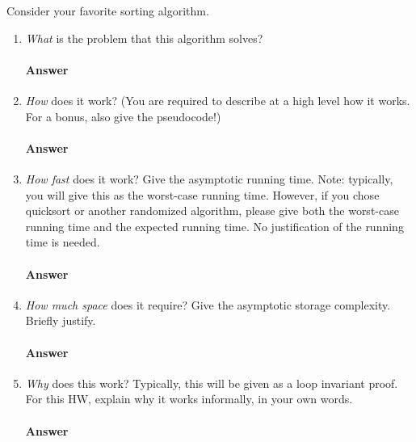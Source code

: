 \documentclass{article}
\begin{document}
\collab{\todo{}}
Consider your favorite sorting algorithm.
\begin{enumerate}
    \item \emph{What} is the problem that this algorithm solves?

        \paragraph{Answer}
        \todo{}

    \item \emph{How} does it work? (You are required to describe at a high level
        how it works.  For a bonus, also give the pseudocode!)

        \paragraph{Answer}
        \todo{}

    \item \emph{How fast} does it work?  Give the asymptotic running time.
        Note: typically, you will give this as the worst-case running time.
        However, if you chose quicksort or another randomized algorithm, please
        give both the worst-case running time and the expected running time.  No
        justification of the running time is needed.

        \paragraph{Answer}
        \todo{}

    \item \emph{How much space} does it require?  Give the asymptotic storage
        complexity.  Briefly justify.

        \paragraph{Answer}
        \todo{}

    \item \emph{Why} does this work? Typically, this will be given as a loop
        invariant proof.  For this HW, explain why it works informally, in your
        own words.

        \paragraph{Answer}
        \todo{}

\end{enumerate}
\end{document}
